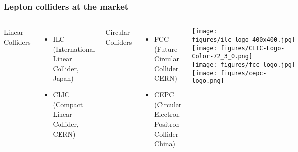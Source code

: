 \documentclass[aspectratio=169]{beamer}
\newcommand{\bluetext}[1]{%
  \textcolor{myBlue}{#1}
}
\begin{document}
\begin{frame}
  \frametitle{Lepton colliders at the market}

  \begin{columns}[c]
    \bluetext{Linear Colliders}
    \begin{itemize}
      \item ILC (International Linear Collider, Japan)
      \item CLIC (Compact Linear Collider, CERN)
    \end{itemize}
    \bluetext{Circular Colliders}
     \begin{itemize}
     \item FCC (Future Circular Collider, CERN)
     \item CEPC (Circular Electron Positron Collider, China)
     \end{itemize}

    \texttt{[image: figures/ilc\_logo\_400x400.jpg]}\\
    \vspace*{-0.5cm}\hspace*{2cm}\texttt{[image: figures/CLIC-Logo-Color-72\_3\_0.png]}\\
    \texttt{[image: figures/fcc\_logo.jpg]}\\
    \vspace*{-0.1cm}\hspace*{1.5cm}\texttt{[image: figures/cepc-logo.png]}\\
   \end{columns}
\end{frame}
\end{document}
